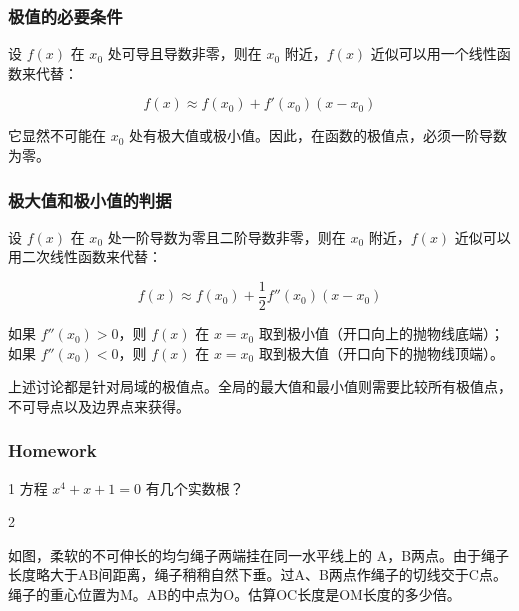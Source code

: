 \documentclass[CJK,13pt]{beamer}
\date{}
\begin{document}
  \bch

\begin{frame}
  \frametitle{极值的必要条件}
  设 $f(x)$ 在 $x_0$ 处可导且导数非零，则在 $x_0$ 附近，$f(x)$ 近似可以用一个线性函数来代替：

  $$f(x)\approx f(x_0)+f'(x_0)(x-x_0)$$

  它显然不可能在 $x_0$ 处有极大值或极小值。因此，{\blue 在函数的极值点，必须一阶导数为零}。
\end{frame}

\begin{frame}
  \frametitle{极大值和极小值的判据}
  设 $f(x)$ 在 $x_0$ 处一阶导数为零且二阶导数非零，则在 $x_0$ 附近，$f(x)$ 近似可以用二次线性函数来代替：

  $$f(x)\approx f(x_0)+\frac{1}{2}f''(x_0)(x-x_0)$$

  如果 $f''(x_0)>0$，则 $f(x)$ 在 $x=x_0$ 取到极小值（开口向上的抛物线底端）；如果  $f''(x_0)<0$，则 $f(x)$ 在 $x=x_0$ 取到极大值（开口向下的抛物线顶端）。

  \skiplines

  上述讨论都是针对局域的极值点。全局的最大值和最小值则需要{\blue 比较所有极值点，不可导点以及边界点}来获得。

\end{frame}










\begin{frame}
  \frametitle{Homework}
  \bitem
\item[1]{方程 $x^4+x+1=0$ 有几个实数根？}
\item[2]{如图，柔软的不可伸长的均匀绳子两端挂在同一水平线上的 A，B两点。由于绳子长度略大于AB间距离，绳子稍稍自然下垂。过A、B两点作绳子的切线交于C点。绳子的重心位置为M。AB的中点为O。估算OC长度是OM长度的多少倍。


  }
  \eitem
\end{frame}

\ech
\end{document}
